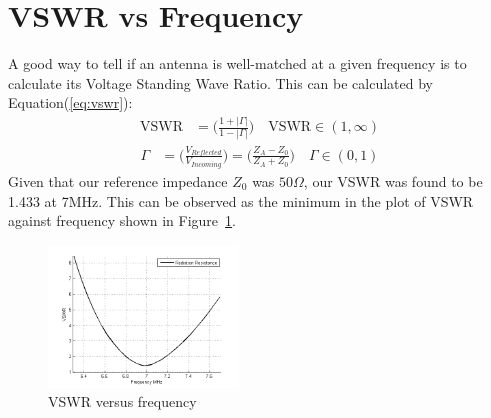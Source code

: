 \section{VSWR vs Frequency}

A good way to tell if an antenna is well-matched at a given frequency is to
calculate its Voltage Standing Wave Ratio. This can be calculated by
Equation(\ref{eq:vswr}):
\begin{align}
  \text{VSWR}&=\bigg(\frac{1+|\Gamma|}{1-|\Gamma|}\bigg)\quad
  \text{VSWR}\in(1,\infty)\label{eq:vswr}
\end{align}
\begin{align*}
  \Gamma&=\bigg(\frac{V_{Reflected}}{V_{Incoming}}\bigg)=\bigg(\frac{Z_A-Z_0}{Z_A+Z_0}\bigg)\quad\Gamma\in(0,1)
\end{align*}
Given that our reference impedance $Z_0$ was $50 \Omega$, our VSWR was found to
be 1.433 at 7MHz. This can be observed as the minimum in the plot of VSWR
against frequency shown in Figure~\ref{fig:vswr}.

\begin{figure}[h!]
  \centering
  \includegraphics[width=0.45\textwidth]{./img/vswr.png}
  \caption{VSWR versus frequency}
  \label{fig:vswr}
\end{figure}

